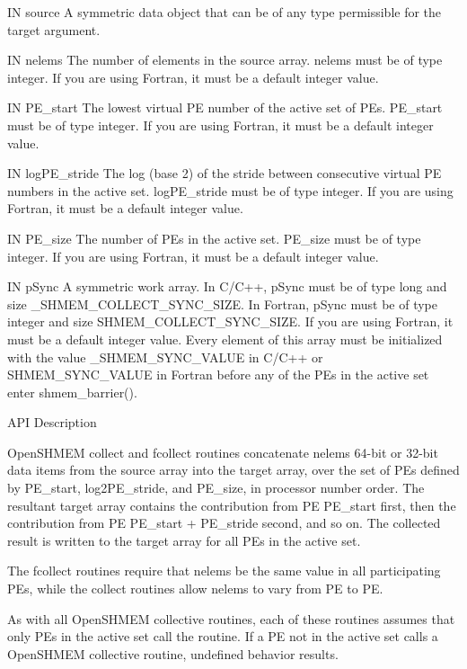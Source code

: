        IN	source	    A	symmetric   data  object  that	can  be	 of  any  type
		    permissible for the target argument.

       IN	nelems	    The number of elements in the source array.	 nelems must be
		    of	type  integer.	If you are using Fortran, it must be a
		    default integer value.

       IN	PE_start	    The lowest virtual PE number of the	 active	 set  of  PEs.
		    PE_start  must  be	of  type  integer.   If	 you are using
		    Fortran, it must be a default integer value.

       IN	logPE_stride The log (base 2) of the stride between consecutive virtual
		    PE	numbers	 in  the  active set.  logPE_stride must be of
		    type integer.  If you are using  Fortran,  it  must	 be  a
		    default integer value.

       IN	PE_size	    The	 number	 of PEs in the active set.  PE_size must be of
		    type integer.  If you are using  Fortran,  it  must	 be  a
		    default integer value.

       IN	pSync	    A  symmetric  work array.  In C/C++, pSync must be of type
		    long and size _SHMEM_COLLECT_SYNC_SIZE.  In Fortran, pSync
		    must  be of type integer and size SHMEM_COLLECT_SYNC_SIZE.
		    If you are using Fortran, it must  be  a  default  integer
		    value.   Every  element  of this array must be initialized
		    with   the	 value	 _SHMEM_SYNC_VALUE   in	   C/C++    or
		    SHMEM_SYNC_VALUE  in  Fortran before any of the PEs in the
		    active set enter shmem_barrier().

API Description

       OpenSHMEM collect  and  fcollect	 routines  concatenate
       nelems  64-bit or  32-bit data items from the source array into the target
       array, over the set of PEs  defined  by	PE_start,  log2PE_stride,  and
       PE_size,	 in  processor	number	order.	 The  resultant	 target	 array
       contains the contribution from PE PE_start first, then the contribution
       from  PE	 PE_start + PE_stride second, and so on.  The collected result
       is written to the target array for all PEs in the active set.

       The fcollect routines require that nelems	 be  the  same	value  in  all
       participating  PEs, while the collect routines allow nelems to vary from
       PE to PE.

       As  with	 all OpenSHMEM collective routines, each of these routines assumes
       that only PEs in the active set call the routine.  If a PE not  in  the
       active  set  calls  a  OpenSHMEM  collective	 routine,  undefined  behavior
       results.

